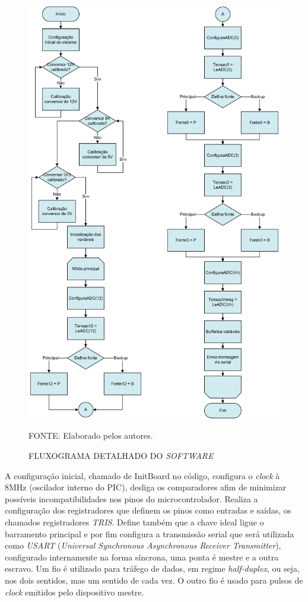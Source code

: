 \documentclass[
	12pt,				%
	openright,			%
	oneside,			%
	a4paper,			%
	english,			%
	french,				%
	spanish,			%
	brazil,				%
	oldfontcommands
	]{abntex2}
\begin{document}
	\begin{figure}[th]
		\caption{FLUXOGRAMA DETALHADO DO \textit{SOFTWARE}}
		\label{Fig_fluxo_detalhado}
		\centering
		\includegraphics[width=0.75\linewidth]{./figs/fluxo_detalhado}
			
		\begin{small}
			FONTE: Elaborado pelos autores.
		\end{small}
	\end{figure}
	\pagebreak

	A configuração inicial, chamado de InitBoard no código, configura o \textit{clock} à 8MHz (oscilador interno do PIC), desliga os comparadores afim de minimizar possíveis incompatibilidades nos pinos do microcontrolador. Realiza a configuração dos registradores que definem os pinos como entradas e saídas, os chamados registradores \textit{TRIS}. Define também que a chave ideal ligue o barramento principal e por fim configura a transmissão serial que será utilizada como \textit{USART} (\textit{Universal Synchronous Asynchronous Receiver Transmitter}), configurado internamente na forma síncrona, uma ponta é mestre e a outra escravo. Um fio é utilizado para tráfego de dados, em regime \textit{half-duplex}, ou seja, nos dois sentidos, mas um sentido de cada vez. O outro fio é usado para pulsos de \textit{clock} emitidos pelo dispositivo mestre.
	
\end{document}
